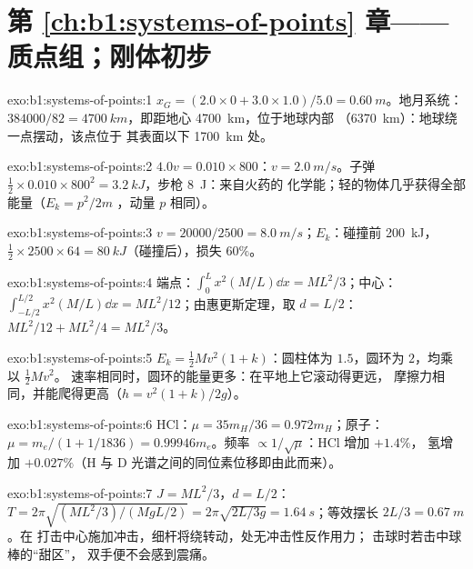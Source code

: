 \section*{第 \ref{ch:b1:systems-of-points} 章——质点组；刚体初步}

\begin{solution}{exo:b1:systems-of-points:1}
$x_G = (2.0 \times 0 + 3.0 \times 1.0)/5.0 = \qty{0.60}{m}$。地月系统：
$384000/82 = \qty{4700}{km}$，即距地心 \qty{4700}{km}，位于地球内部
（\qty{6370}{km}）：地球绕一点摆动，该点位于
其表面以下 \qty{1700}{km} 处。
\end{solution}

\begin{solution}{exo:b1:systems-of-points:2}
$4.0v = 0.010 \times 800$：$v = \qty{2.0}{m/s}$。子弹 $\tfrac12 \times 0.010
\times 800^2 = \qty{3.2}{kJ}$，步枪 \qty{8}{J}：来自火药的
化学能；轻的物体几乎获得全部能量（$E_k = p^2/2m$
，动量 $p$ 相同）。
\end{solution}

\begin{solution}{exo:b1:systems-of-points:3}
$v = 20000/2500 = \qty{8.0}{m/s}$；$E_k$：碰撞前 \qty{200}{kJ}，$\tfrac12 \times
2500 \times 64 = \qty{80}{kJ}$（碰撞后），损失 $60\%$。
\end{solution}

\begin{solution}{exo:b1:systems-of-points:4}
端点：$\int_0^L x^2(M/L)\dd x = ML^2/3$；中心：$\int_{-L/2}^{L/2}x^2(M/L)
\dd x = ML^2/12$；由惠更斯定理，取 $d = L/2$：$ML^2/12 + ML^2/4 = ML^2/3$。
\end{solution}

\begin{solution}{exo:b1:systems-of-points:5}
$E_k = \tfrac12 Mv^2(1 + k)$：圆柱体为 $1.5$，圆环为 $2$，均乘以 $\tfrac12 Mv^2$。
速率相同时，圆环的能量更多：在平地上它滚动得更远，
摩擦力相同，并能爬得更高（$h = v^2(1 + k)/2g$）。
\end{solution}

\begin{solution}{exo:b1:systems-of-points:6}
HCl：$\mu = 35m_H/36 = 0.972m_H$；原子：$\mu = m_e/(1 + 1/1836) =
0.99946m_e$。频率 $\propto 1/\sqrt\mu$：HCl 增加 $+1.4\%$，
氢增加 $+0.027\%$（H 与 D 光谱之间的同位素位移即由此而来）。
\end{solution}

\begin{solution}{exo:b1:systems-of-points:7}
$J = ML^2/3$，$d = L/2$：$T = 2\pi\sqrt{(ML^2/3)/(MgL/2)} = 2\pi\sqrt{2L/3g}
= \qty{1.64}{s}$；等效摆长 $2L/3 = \qty{0.67}{m}$。在
打击中心施加冲击，细杆将绕转动，处无冲击性反作用力；
击球时若击中球棒的“甜区”，
双手便不会感到震痛。
\end{solution}

